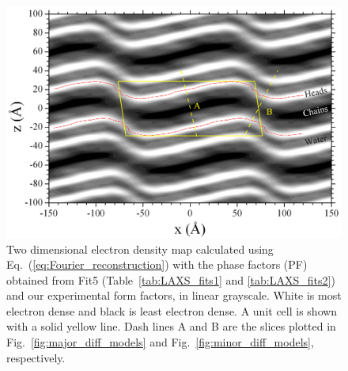 \begin{landscape}
\begin{figure}[htbp]
  \centering
  \includegraphics[width=0.85\linewidth]{figures/ripple/LAXS/Fit5_2D_edp}
  \caption[Two dimensional electron density map calculated using 
  Eq.~(\ref{eq:Fourier_reconstruction}) with the phase factors (PF) 
  obtained from Fit5 (Table~\ref{tab:LAXS_fits1} and \ref{tab:LAXS_fits2}) 
  and our experimental form factors]
  {Two dimensional electron density map calculated using 
  Eq.~(\ref{eq:Fourier_reconstruction}) with the phase factors (PF) obtained 
  from Fit5 (Table~\ref{tab:LAXS_fits1} and \ref{tab:LAXS_fits2}) and our 
  experimental form factors, in linear grayscale. 
  White is most electron dense and black is least electron dense. 
  A unit cell is shown with a solid yellow line. 
  Dash lines A and B are the slices plotted in  Fig.~\ref{fig:major_diff_models} 
  and Fig.~\ref{fig:minor_diff_models}, respectively.}
  \label{fig:Fit5_2D_edp}
\end{figure}
\end{landscape}

